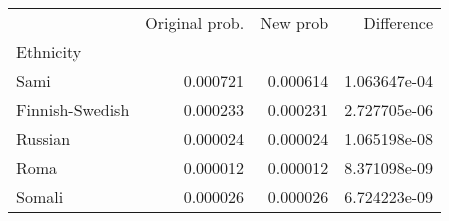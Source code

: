 \begin{tabular}{lrrr}
\toprule
{} &  Original prob. &  New prob &    Difference \\
Ethnicity       &                 &           &               \\
\midrule
Sami            &        0.000721 &  0.000614 &  1.063647e-04 \\
Finnish-Swedish &        0.000233 &  0.000231 &  2.727705e-06 \\
Russian         &        0.000024 &  0.000024 &  1.065198e-08 \\
Roma            &        0.000012 &  0.000012 &  8.371098e-09 \\
Somali          &        0.000026 &  0.000026 &  6.724223e-09 \\
\bottomrule
\end{tabular}

